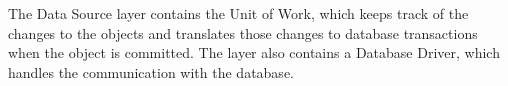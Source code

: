 The Data Source layer contains the Unit of Work, which keeps track of the changes to the objects and translates those changes to database transactions when the object is committed. The layer also contains a Database Driver, which handles the communication with the database.





%
%

%
%
%

